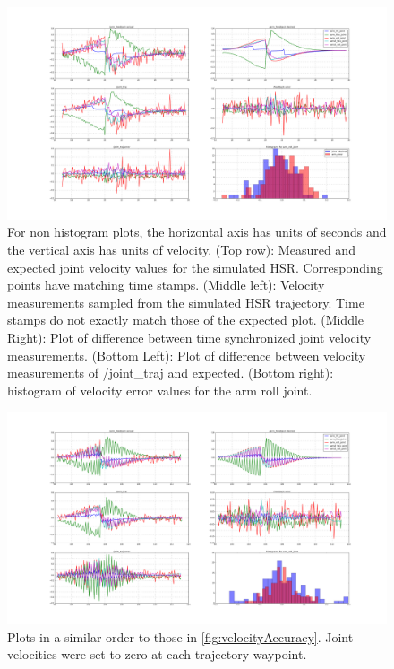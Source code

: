 \documentclass[12pt]{article}
\begin{document}
        \begin{figure}
            \includegraphics[width=\linewidth]{2020.04.03/t8/figure_1_first_100_points_20_bins_trial6.png}
            \centering
            \caption{For non histogram plots, the horizontal axis has units of seconds and the vertical axis has units of velocity. (Top row): Measured and expected joint velocity values for the simulated HSR. Corresponding points have matching time stamps. (Middle left): Velocity measurements sampled from the simulated HSR trajectory. Time stamps do not exactly match those of the expected plot. (Middle Right): Plot of difference between time synchronized joint velocity measurements. (Bottom Left): Plot of difference between velocity measurements of /joint\_traj and expected. (Bottom right): histogram of velocity error values for the arm roll joint.}
            \label{fig:velocityAccuracy}
        \end{figure}
        \begin{figure}[ht]
            \includegraphics[width=\linewidth]{2020.04.07/arm_vel_goals_set_to_zero.png}
            \centering
            \caption{Plots in a similar order to those in \autoref{fig:velocityAccuracy}. Joint velocities were set to zero at each trajectory waypoint.}
            \label{fig:velocityZero}
        \end{figure}
\end{document}
